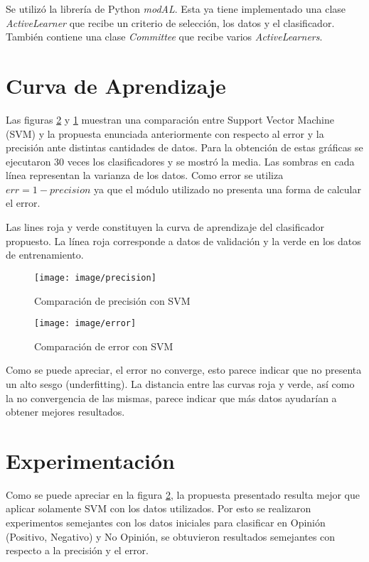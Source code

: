 \documentclass[]{article}
\begin{document}
Se utilizó la librería de Python \textit{modAL}. Esta ya tiene implementado una clase \textit{ActiveLearner} que recibe un criterio de selección, los datos y el clasificador. También contiene una clase \textit{Committee} que recibe varios \textit{ActiveLearners}.

\section{Curva de Aprendizaje}


Las figuras \ref{img:e} y \ref{img:P} muestran una comparación entre Support Vector Machine (SVM) y la propuesta enunciada anteriormente con respecto al error y la precisión ante distintas cantidades de datos. Para la obtención de estas gráficas se ejecutaron 30 veces los clasificadores y se mostró la media. Las sombras en cada línea representan la varianza de los datos. Como error se utiliza $err = 1 - precision$ ya que el módulo utilizado no presenta una forma de calcular el error.   

Las lines roja y verde constituyen la curva de aprendizaje del clasificador propuesto. La línea roja corresponde a datos de validación y la verde en los datos de entrenamiento. 

\begin{figure}[h!]
	\centering
	\texttt{[image: image/precision]}
    \caption{\label{img:P}Comparación de precisión con SVM}
\end{figure}

\begin{figure}[h!]
	\centering
    \texttt{[image: image/error]}
    \caption{\label{img:e}Comparación de error con SVM}
\end{figure}

Como se puede apreciar, el error no converge, esto parece indicar que no presenta un alto sesgo (underfitting). La distancia entre las curvas roja y verde, así como la no convergencia de las mismas, parece indicar que más datos ayudarían a obtener mejores resultados. 

\section{Experimentación}

Como se puede apreciar en la figura \ref{img:e}, la propuesta presentado resulta mejor que aplicar solamente SVM con los datos utilizados. Por esto se realizaron experimentos semejantes con los datos iniciales para clasificar en Opinión (Positivo, Negativo) y No Opinión, se obtuvieron resultados semejantes con respecto a la precisión y el error. 
\end{document}
